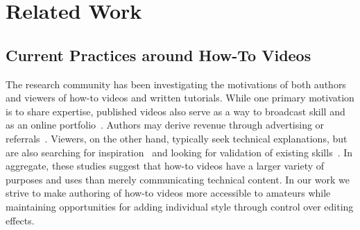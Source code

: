 \section{Related Work}



\subsection{Current Practices around How-To Videos}

The research community has been investigating the motivations of both authors and viewers of how-to videos and written tutorials. While one primary motivation is to share expertise, published videos also serve as a way to broadcast skill and as an online portfolio~\cite{Torrey:2007he}. Authors may derive revenue through advertising or referrals~\cite{Lafreniere:2012tl}. Viewers, on the other hand, typically seek technical explanations, but are also searching for inspiration~\cite{Torrey:2009fc} and looking for validation of existing skills~\cite{Lafreniere:2012tl}.
In aggregate, these studies suggest that how-to videos have a larger variety of purposes and uses than merely communicating technical content.
In our work we strive to make authoring of how-to videos more accessible to amateurs while maintaining opportunities for adding individual style through control over editing effects.

